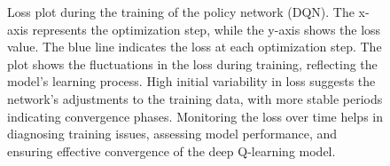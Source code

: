 \begin{figure}[!h]
\centering
\centerline{}
\caption{Loss plot during the training of the policy network (DQN). The x-axis represents the optimization step, while the y-axis shows the loss value. The blue line indicates the loss at each optimization step. The plot shows the fluctuations in the loss during training, reflecting the model's learning process. High initial variability in loss suggests the network's adjustments to the training data, with more stable periods indicating convergence phases. Monitoring the loss over time helps in diagnosing training issues, assessing model performance, and ensuring effective convergence of the deep Q-learning model.}
\label{fig: loss}
\end{figure}


